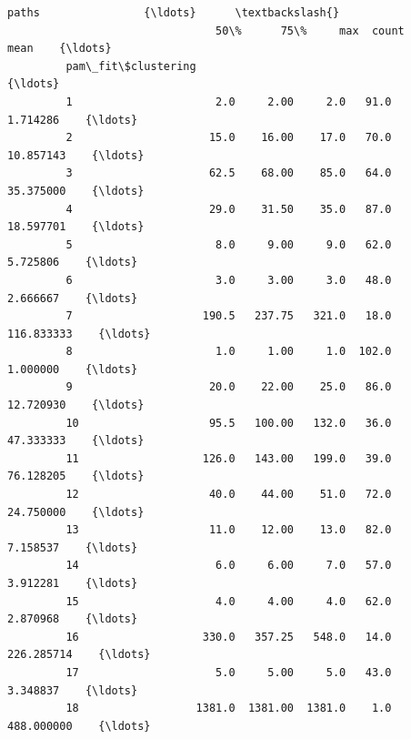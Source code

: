 \documentclass[11pt]{article}
\begin{document}
\begin{Verbatim}[commandchars=\\\{\}]
                                                      paths                {\ldots}      \textbackslash{}
                                50\%      75\%     max  count        mean    {\ldots}       
         pam\_fit\$clustering                                                {\ldots}       
         1                      2.0     2.00     2.0   91.0    1.714286    {\ldots}       
         2                     15.0    16.00    17.0   70.0   10.857143    {\ldots}       
         3                     62.5    68.00    85.0   64.0   35.375000    {\ldots}       
         4                     29.0    31.50    35.0   87.0   18.597701    {\ldots}       
         5                      8.0     9.00     9.0   62.0    5.725806    {\ldots}       
         6                      3.0     3.00     3.0   48.0    2.666667    {\ldots}       
         7                    190.5   237.75   321.0   18.0  116.833333    {\ldots}       
         8                      1.0     1.00     1.0  102.0    1.000000    {\ldots}       
         9                     20.0    22.00    25.0   86.0   12.720930    {\ldots}       
         10                    95.5   100.00   132.0   36.0   47.333333    {\ldots}       
         11                   126.0   143.00   199.0   39.0   76.128205    {\ldots}       
         12                    40.0    44.00    51.0   72.0   24.750000    {\ldots}       
         13                    11.0    12.00    13.0   82.0    7.158537    {\ldots}       
         14                     6.0     6.00     7.0   57.0    3.912281    {\ldots}       
         15                     4.0     4.00     4.0   62.0    2.870968    {\ldots}       
         16                   330.0   357.25   548.0   14.0  226.285714    {\ldots}       
         17                     5.0     5.00     5.0   43.0    3.348837    {\ldots}       
         18                  1381.0  1381.00  1381.0    1.0  488.000000    {\ldots}       
         

\end{Verbatim}
\end{document}
